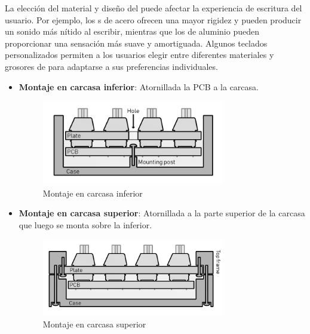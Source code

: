 La elección del material y diseño del  puede afectar la experiencia de escritura del usuario. Por ejemplo, los s de acero ofrecen una mayor rigidez y pueden producir un sonido más nítido al escribir, mientras que los  de aluminio pueden proporcionar una sensación más suave y amortiguada. Algunos teclados personalizados permiten a los usuarios elegir entre diferentes materiales y grosores de  para adaptarse a sus preferencias individuales.

\begin{itemize}
    \item \textbf{Montaje en carcasa inferior}: Atornillada la \gls{PCB} a la carcasa.
    \begin{figure}[H]
        \centering
        \includegraphics[width=0.75\textwidth]{imagenes/Capitulos/Cap03/Montajes/Montaje1.png}
        \caption{Montaje en carcasa inferior \cite{Keyboards-Mounting-Styles}}
        \label{fig:Montaje1}
    \end{figure}
    
    \item \textbf{Montaje en carcasa superior}: Atornillada a la parte superior de la carcasa que luego se monta sobre la inferior.
    \begin{figure}[H]
        \centering
        \includegraphics[width=0.75\textwidth]{imagenes/Capitulos/Cap03/Montajes/Montaje2.png}
        \caption{Montaje en carcasa superior \cite{Keyboards-Mounting-Styles}}
        \label{fig:Montaje2}
    \end{figure}
    

\end{itemize}
